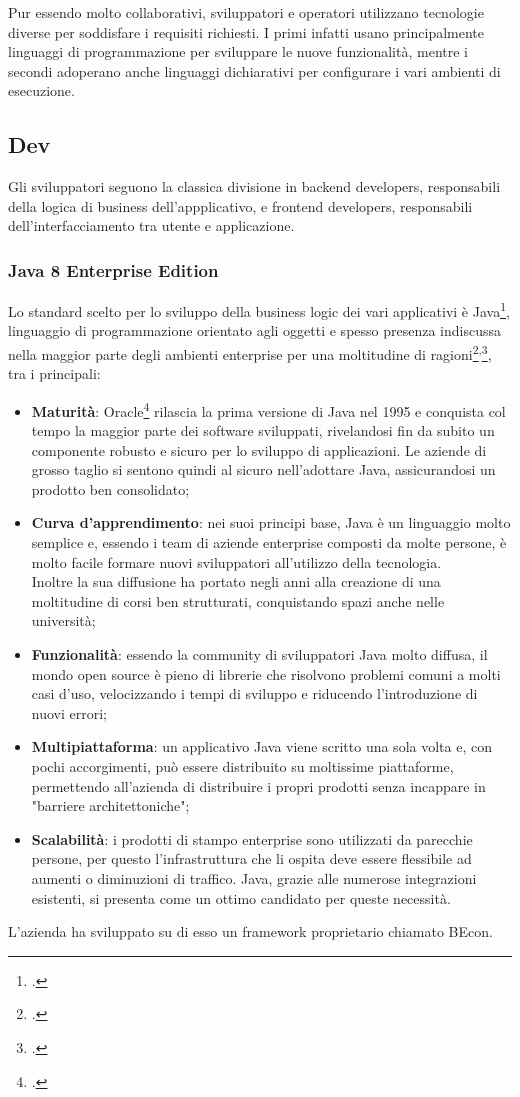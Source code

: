 Pur essendo molto collaborativi, sviluppatori e operatori utilizzano tecnologie diverse per soddisfare i requisiti richiesti. I primi infatti usano principalmente linguaggi di programmazione per sviluppare le nuove funzionalità, mentre i secondi adoperano anche linguaggi dichiarativi per configurare i vari ambienti di esecuzione.
\subsection{Dev}
Gli sviluppatori seguono la classica divisione in backend developers, responsabili della logica di business dell'appplicativo, e frontend developers, responsabili dell'interfacciamento tra utente e applicazione.
\subsubsection{Java 8 Enterprise Edition}
Lo standard scelto per lo sviluppo della business logic dei vari applicativi è Java\footcite{site:java}, linguaggio di programmazione orientato agli oggetti e spesso presenza indiscussa nella maggior parte degli ambienti enterprise per una moltitudine di ragioni\footcite{article:sojava}\textsuperscript{,}\footcite{article:mediumjava}, tra i principali:
\begin{itemize}
	\item \textbf{Maturità}: Oracle\footcite{site:oracle} rilascia la prima versione di Java nel 1995 e conquista col tempo la maggior parte dei software sviluppati, rivelandosi fin da subito un componente robusto e sicuro per lo sviluppo di applicazioni. Le aziende di grosso taglio si sentono quindi al sicuro nell'adottare Java, assicurandosi un prodotto ben consolidato;
	\item \textbf{Curva d'apprendimento}: nei suoi principi base, Java è un linguaggio molto semplice e, essendo i team di aziende enterprise composti da molte persone, è molto facile formare nuovi sviluppatori all'utilizzo della tecnologia.\\
	Inoltre la sua diffusione ha portato negli anni alla creazione di una moltitudine di corsi ben strutturati, conquistando spazi anche nelle università;
	\item \textbf{Funzionalità}: essendo la community di sviluppatori Java molto diffusa, il mondo open source è pieno di librerie che risolvono problemi comuni a molti casi d'uso, velocizzando i tempi di sviluppo e riducendo l'introduzione di nuovi errori;
	\item \textbf{Multipiattaforma}: un applicativo Java viene scritto una sola volta e, con pochi accorgimenti, può essere distribuito su moltissime piattaforme, permettendo all'azienda di distribuire i propri prodotti senza incappare in "barriere architettoniche";
	\item \textbf{Scalabilità}: i prodotti di stampo enterprise sono utilizzati da parecchie persone, per questo l'infrastruttura che li ospita deve essere flessibile ad aumenti o diminuzioni di traffico. Java, grazie alle numerose integrazioni esistenti, si presenta come un ottimo candidato per queste necessità.
\end{itemize}
L'azienda ha sviluppato su di esso un \gls{framework} proprietario chiamato BEcon.
